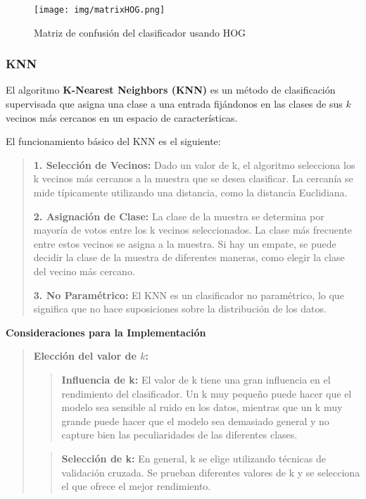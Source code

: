 \documentclass[a4paper, 12pt]{article}
\begin{document}
\begin{figure}[h]
	\centering
	\texttt{[image: img/matrixHOG.png]}
 	\caption{Matriz de confusión del clasificador usando HOG}\vspace{0.5cm}
	\label{fig:normalizacion}
\end{figure}


\subsubsection{KNN}
El algoritmo \textbf{K-Nearest Neighbors (KNN)} es un método de clasificación supervisada que asigna una clase a una entrada fijándonos en las clases de sus $k$ vecinos más cercanos en un espacio de características. 

El funcionamiento básico del KNN es el siguiente:

\begin{quote}
	\textbf{1. Selección de Vecinos:} Dado un valor de k, el algoritmo selecciona los k vecinos más cercanos a la muestra que se desea clasificar. La cercanía se mide típicamente utilizando una distancia, como la distancia Euclidiana.
	
	\textbf{2. Asignación de Clase:} La clase de la muestra se determina por mayoría de votos entre los k vecinos seleccionados. La clase más frecuente entre estos vecinos se asigna a la muestra. Si hay un empate, se puede decidir la clase de la muestra de diferentes maneras, como elegir la clase del vecino más cercano.
	
	\textbf{3. No Paramétrico:} El KNN es un clasificador no paramétrico, lo que significa que no hace suposiciones sobre la distribución de los datos.
	
\end{quote}

\textbf{Consideraciones para la Implementación}

\begin{quote}
	\textbf{Elección del valor de $k$:}
	\begin{quote}
		\textbf{Influencia de k:} El valor de k tiene una gran influencia en el rendimiento del clasificador. Un k muy pequeño puede hacer que el modelo sea sensible al ruido en los datos, mientras que un k muy grande puede hacer que el modelo sea demasiado general y no capture bien las peculiaridades de las diferentes clases.
	\end{quote}
	
	\begin{quote}
		\textbf{Selección de k:} En general, k se elige utilizando técnicas de validación cruzada. Se prueban diferentes valores de k y se selecciona el que ofrece el mejor rendimiento.
	\end{quote}
	
\end{quote}
\end{document}
